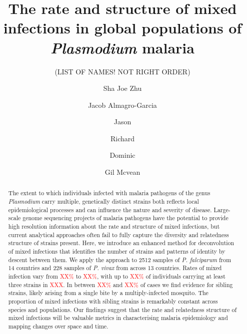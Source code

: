 \documentclass{article}
\newcounter{todocounter}
\newcommand{\done}[2][]
{\todo[color=green!40, #1]{#2}}
\newcommand{\donenum}[2][]
{\stepcounter{todocounter}\done[#1]{\thetodocounter: #2}}
\begin{document}
\title{The rate and structure of mixed infections in global populations of {\it Plasmodium} malaria}
\newcommand\shorttitle{Global malaria mixed infection}
\date{}

\author{(LIST OF NAMES! NOT RIGHT ORDER)}
\author[1,2]{Sha Joe Zhu}
\author[1,2,3,4]{Jacob Almagro-Garcia}
\author[2]{Jason}
\author[1,3,4]{Richard}
\author[1,2,3,4]{Dominic}
\author[1,2]{Gil Mcvean}


\maketitle
{}
\listoftodos
{}





\begin{abstract}
The extent to which individuals infected with malaria pathogens of the genus {\it Plasmodium} carry multiple, genetically distinct strains both reflects local epidemiological processes and can influence the nature and severity of disease.  Large-scale genome sequencing projects of malaria pathogens have the potential to provide high resolution information about the rate and structure of mixed infections, but current analytical approaches often fail to fully capture the diversity and relatedness structure of strains present.  Here, we introduce an enhanced method for deconvolution of mixed infections that identifies the number of strains and patterns of identity by descent between them.  We apply the approach to 2512 samples of {\it P. falciparum} from 14 countries and 228 samples of {\it P. vivax} from across 13 countries.
Rates of mixed infection vary from \textcolor{red}{XX\%} to \textcolor{red}{XX\%}, with up to \textcolor{red}{XX\%} of individuals carrying at least three strains in \textcolor{red}{XXX}.  In between \textcolor{red}{XX\%} and \textcolor{red}{XX\%} of cases we find evidence for sibling strains, likely arising from a single bite by a multiply-infected mosquito.  The proportion of mixed infections with sibling strains is remarkably constant across species and populations.  Our findings suggest that the rate and relatedness structure of mixed infections will be valuable metrics in characterising malaria epidemiology and mapping changes over space and time.
\end{abstract}
\end{document}
